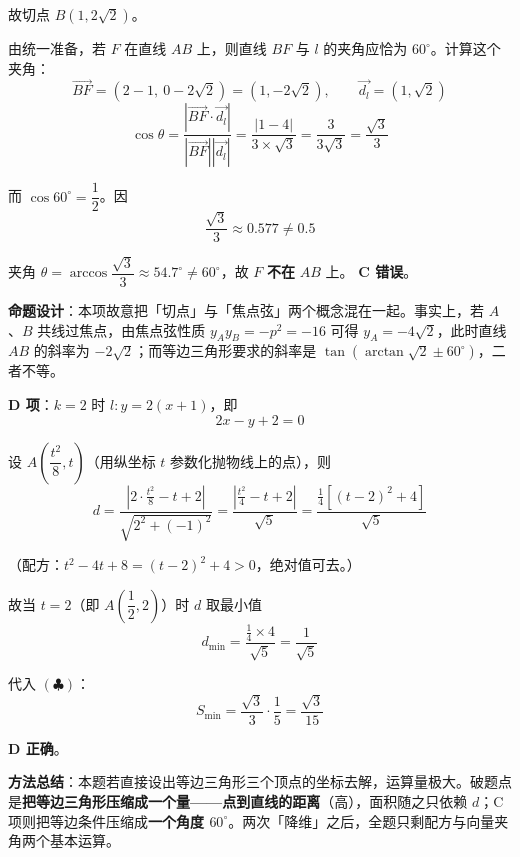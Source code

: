 故切点 $B\left(1,2\sqrt2\right)$。

由统一准备，若 $F$ 在直线 $AB$ 上，则直线 $BF$ 与 $l$ 的夹角应恰为 $60^\circ$。计算这个夹角：
\[\overrightarrow{BF}=(2-1,\ 0-2\sqrt2)=\left(1,-2\sqrt2\right),\qquad \vec{d_l}=\left(1,\sqrt2\right)\]
\[\cos\theta=\frac{\left|\overrightarrow{BF}\cdot\vec{d_l}\right|}{\left|\overrightarrow{BF}\right|\left|\vec{d_l}\right|}=\frac{\left|1-4\right|}{3\times\sqrt3}=\frac{3}{3\sqrt3}=\frac{\sqrt3}{3}\]

而 $\cos60^\circ=\dfrac12$。因
\[\frac{\sqrt3}{3}\approx0.577\ne0.5\]

夹角 $\theta=\arccos\dfrac{\sqrt3}{3}\approx54.7^\circ\ne60^\circ$，故 $F$ \textbf{不在} $AB$ 上。 \textbf{C 错误}。

\begin{gktip}
\textbf{命题设计}：本项故意把「切点」与「焦点弦」两个概念混在一起。事实上，若 $A$、$B$ 共线过焦点，由焦点弦性质 $y_Ay_B=-p^2=-16$ 可得 $y_A=-4\sqrt2$，此时直线 $AB$ 的斜率为 $-2\sqrt2$；而等边三角形要求的斜率是 $\tan\left(\arctan\sqrt2\pm60^\circ\right)$，二者不等。
\end{gktip}

\par\medskip

\textbf{D 项}：$k=2$ 时 $l:y=2(x+1)$，即
\[2x-y+2=0\]

设 $A\left(\dfrac{t^2}{8},t\right)$（用纵坐标 $t$ 参数化抛物线上的点），则
\[d=\frac{\left|2\cdot\frac{t^2}{8}-t+2\right|}{\sqrt{2^2+(-1)^2}}=\frac{\left|\frac{t^2}{4}-t+2\right|}{\sqrt5}=\frac{\frac14\left[(t-2)^2+4\right]}{\sqrt5}\]

（配方：$t^2-4t+8=(t-2)^2+4>0$，绝对值可去。）

故当 $t=2$（即 $A\left(\dfrac12,2\right)$）时 $d$ 取最小值
\[d_{\min}=\frac{\frac14\times4}{\sqrt5}=\frac{1}{\sqrt5}\]

代入 $(\clubsuit)$：
\[S_{\min}=\frac{\sqrt3}{3}\cdot\frac15=\frac{\sqrt3}{15}\]

 \textbf{D 正确}。


\begin{gktip}
\textbf{方法总结}：本题若直接设出等边三角形三个顶点的坐标去解，运算量极大。破题点是\textbf{把等边三角形压缩成一个量——点到直线的距离}（高），面积随之只依赖 $d$；C 项则把等边条件压缩成\textbf{一个角度 $60^\circ$}。两次「降维」之后，全题只剩配方与向量夹角两个基本运算。
\end{gktip}

\par\medskip

